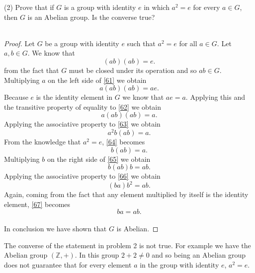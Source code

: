 \documentclass[11pt,a4paper]{article}
\begin{document}
(2) Prove that if $G$ is a group with identity $e$ in which $a^2 = e$ for every $a \in G$, then $G$ is an Abelian group. Is the converse true?\\
~\\
\begin{proof}
Let $G$ be a group with identity $e$ such that $a^2 = e$ for all $a\in G$. Let $a,b\in G$. We know that
\begin{equation}\label{61}
(ab)(ab) = e.
\end{equation}
from the fact that $G$ must be closed under its operation and so $ab\in G$. 
Multiplying $a$ on the left side of \eqref{61} we obtain
\begin{equation}\label{62}
a(ab)(ab) = ae.
\end{equation}
Because $e$ is the identity element in $G$ we know that $ae = a$. Applying this and the transitive property of equality to \eqref{62} we obtain
\begin{equation}\label{63}
a(ab)(ab) = a.
\end{equation}
Applying the associative property to \eqref{63} we obtain
\begin{equation}\label{64}
a^2b(ab) = a.
\end{equation}
From the knowledge that $a^2= e$, \eqref{64} becomes
\begin{equation}\label{65}
b(ab) = a.
\end{equation}
Multiplying $b$ on the right side of \eqref{65} we obtain
\begin{equation}\label{66}
b(ab)b = ab.
\end{equation}
Applying the associative property to \eqref{66} we obtain
\begin{equation}\label{67}
(ba)b^2 = ab.
\end{equation}
Again, coming from the fact that any element multiplied by itself is the identity element, \eqref{67} becomes
\[ba = ab.\]
~\\
In conclusion we have shown that $G$ is Abelian.
\end{proof}

The converse of the statement in problem 2 is not true. For example we have the Abelian group $(\mathbb{Z},+)$. In this group $2+2 \neq 0$ and so being an Abelian group does not guarantee that for every element $a$ in the group with identity $e$, $a^2 = e$.
\end{document}
